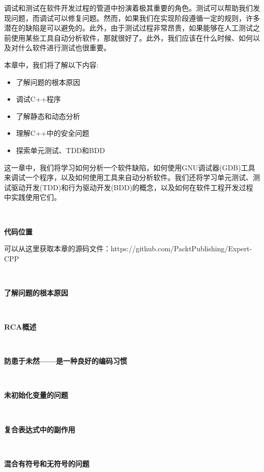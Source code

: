 调试和测试在软件开发过程的管道中扮演着极其重要的角色。测试可以帮助我们发现问题，而调试可以修复问题。然而，如果我们在实现阶段遵循一定的规则，许多潜在的缺陷是可以避免的。此外，由于测试过程非常昂贵，如果能够在人工测试之前使用某些工具自动分析软件，那就很好了。此外，我们应该在什么时候、如何以及对什么软件进行测试也很重要。 \par

本章中，我们将了解以下内容: \par

\begin{itemize}
	\item 了解问题的根本原因
	\item 调试C++程序
	\item 了解静态和动态分析
	\item 理解C++中的安全问题
	\item 探索单元测试、TDD和BDD
\end{itemize}

这一章中，我们将学习如何分析一个软件缺陷，如何使用GNU调试器(GDB)工具来调试一个程序，以及如何使用工具来自动分析软件。我们还将学习单元测试、测试驱动开发(TDD)和行为驱动开发(BDD)的概念，以及如何在软件工程开发过程中实践使用它们。 \par

\noindent\textbf{}\ \par
\textbf{代码位置} \ \par
可以从这里获取本章的源码文件：https:/​/github.​com/PacktPublishing/Expert-CPP \par

\noindent\textbf{}\ \par
\textbf{了解问题的根本原因} \ \par

\noindent\textbf{}\ \par
\textbf{RCA概述} \ \par

\noindent\textbf{}\ \par
\textbf{防患于未然——是一种良好的编码习惯} \ \par

\noindent\textbf{}\ \par
\textbf{未初始化变量的问题} \ \par

\noindent\textbf{}\ \par
\textbf{复合表达式中的副作用} \ \par

\noindent\textbf{}\ \par
\textbf{混合有符号和无符号的问题} \ \par

